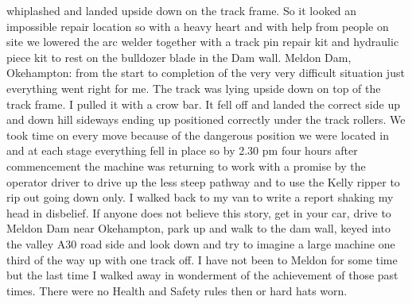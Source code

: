 whiplashed and landed upside down on the track frame. So it looked an
impossible repair location so with a heavy heart and with help from people on
site we lowered the arc welder together with a track pin repair kit and
hydraulic piece kit to rest on the bulldozer blade in the Dam wall. Meldon Dam,
Okehampton: from the start to completion of the very very difficult situation
just everything went right for me. The track was lying upside down on top of
the track frame. I pulled it with a crow bar. It fell off and landed the
correct side up and down hill sideways ending up positioned correctly under the
track rollers. We took time on every move because of the dangerous position we
were located in and at each stage everything fell in place so by 2.30 pm four
hours after commencement the machine was returning to work with a promise by
the operator driver to drive up the less steep pathway and to use the Kelly
ripper to rip out going down only. I walked back to my van to write a report
shaking my head in disbelief. If anyone does not believe this story, get in
your car, drive to Meldon Dam near Okehampton, park up and walk to the dam
wall, keyed into the valley A30 road side and look down and try to imagine a
large machine one third of the way up with one track off. I have not been to
Meldon for some time but the last time I walked away in wonderment of the
achievement of those past times. There were no Health and Safety rules then or
hard hats worn.
